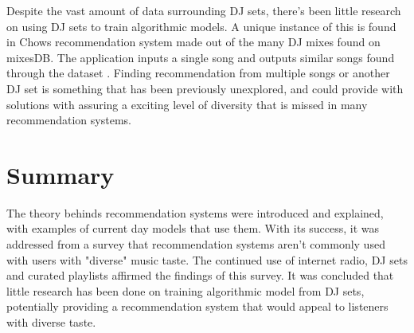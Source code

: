 Despite the vast amount of data surrounding DJ sets, there's been little research on using DJ sets to train algorithmic models. A unique instance of this is found in Chows recommendation system made out of the many DJ mixes found on mixesDB. The application inputs a single song and outputs similar songs found through the dataset \citep{chow_music_2020}. Finding recommendation from multiple songs or another DJ set is something that has been previously unexplored, and could provide with solutions with assuring a exciting level of diversity that is missed in many recommendation systems.


\section{Summary}
The theory behinds recommendation systems were introduced and explained, with examples of current day models that use them. With its success, it was addressed from a survey that recommendation systems aren't commonly used with users with "diverse" music taste. The continued use of internet radio, DJ sets and curated playlists affirmed the findings of this survey. It was concluded that little research has been done on training algorithmic model from DJ sets, potentially providing a recommendation system that would appeal to listeners with diverse taste. 

